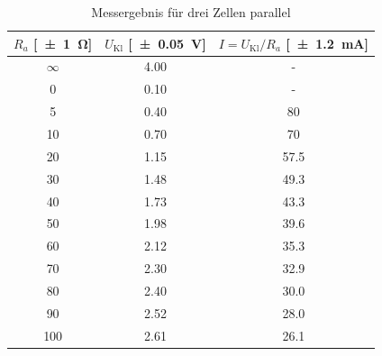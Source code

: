 \begin{table}[H]
  \centering
  \begin{tabular}{c c c} \toprule
    $R_a$ [\SI{\pm 1}{\ohm}] & $U_{\text{Kl}}$ [\SI{\pm .05}{V}] & $I=U_{\text{Kl}}/R_a$ [\SI{\pm 1.2}{mA}] \\ \midrule
    $\infty$ & \num{4.00} & - \\
    0 & \num{0.10} & - \\
    5 & \num{0.40} & \num{80} \\
    10 & \num{.70} & \num{70} \\
    20 & \num{1.15} & \num{57.5} \\
    30 & \num{1.48} & \num{49.3} \\
    40 & \num{1.73} & \num{43.3} \\
    50 & \num{1.98} & \num{39.6} \\
    60 & \num{2.12} & \num{35.3} \\
    70 & \num{2.30} & \num{32.9} \\
    80 & \num{2.40} & \num{30.0} \\
    90 & \num{2.52} & \num{28.0} \\
    100 & \num{2.61} & \num{26.1} \\ \bottomrule
  \end{tabular}
  \caption{Messergebnis für drei Zellen parallel}
  \label{tab:einezelle}
\end{table}

